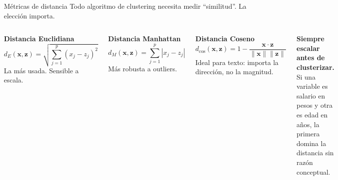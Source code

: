 \documentclass[aspectratio=169]{beamer}
\begin{document}
\begin{frame}{Métricas de distancia}
Todo algoritmo de clustering necesita medir ``similitud''. La elección importa.

\medskip
\begin{columns}[T]
\textbf{Distancia Euclidiana}
\[
d_E(\mathbf{x},\mathbf{z}) = \sqrt{\sum_{j=1}^{p}(x_j - z_j)^2}
\]
La más usada. Sensible a escala.

\medskip
\textbf{Distancia Manhattan}
\[
d_M(\mathbf{x},\mathbf{z}) = \sum_{j=1}^{p}|x_j - z_j|
\]
Más robusta a outliers.

\textbf{Distancia Coseno}
\[
d_{\cos}(\mathbf{x},\mathbf{z}) = 1 - \frac{\mathbf{x} \cdot \mathbf{z}}{\|\mathbf{x}\|\|\mathbf{z}\|}
\]
Ideal para texto: importa la dirección, no la magnitud.

\medskip
\begin{atencion}
\textbf{Siempre escalar antes de clusterizar.} Si una variable es salario en pesos y otra es edad en años, la primera domina la distancia sin razón conceptual.
\end{atencion}
\end{columns}
\end{frame}
\end{document}
